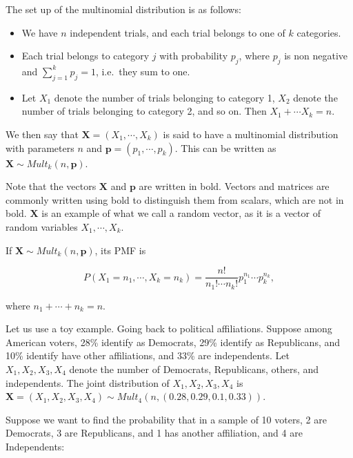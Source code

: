 \documentclass[
]{book}
\providecommand{\tightlist}{%
  \setlength{\itemsep}{0pt}\setlength{\parskip}{0pt}}
\begin{document}
The set up of the multinomial distribution is as follows:

\begin{itemize}
\tightlist
\item
  We have \(n\) independent trials, and each trial belongs to one of \(k\) categories.
\item
  Each trial belongs to category \(j\) with probability \(p_j\), where \(p_j\) is non negative and \(\sum_{j=1}^k p_j = 1\), i.e.~they sum to one.
\item
  Let \(X_1\) denote the number of trials belonging to category 1, \(X_2\) denote the number of trials belonging to category 2, and so on. Then \(X_1 + \cdots X_k = n\).
\end{itemize}

We then say that \(\boldsymbol{X} = (X_1, \cdots, X_k)\) is said to have a multinomial distribution with parameters \(n\) and \(\boldsymbol{p} = (p_1, \cdots, p_k)\). This can be written as \(\boldsymbol{X} \sim Mult_k(n, \boldsymbol{p})\).

Note that the vectors \(\boldsymbol{X}\) and \(\boldsymbol{p}\) are written in bold. Vectors and matrices are commonly written using bold to distinguish them from scalars, which are not in bold. \(\boldsymbol{X}\) is an example of what we call a random vector, as it is a vector of random variables \(X_1, \cdots, X_k\).

If \(\boldsymbol{X} \sim Mult_k(n, \boldsymbol{p})\), its PMF is

\begin{equation} 
P(X_1 = n_1, \cdots, X_k = n_k) = \frac{n!}{n_{1}! \cdots n_{k}!} p_1^{n_1} \cdots p_k^{n_k},
\label{eq:5-multinomial}
\end{equation}

where \(n_1 + \cdots + n_k = n\).

Let us use a toy example. Going back to political affiliations. Suppose among American voters, 28\% identify as Democrats, 29\% identify as Republicans, and 10\% identify have other affiliations, and 33\% are independents. Let \(X_1, X_2, X_3, X_4\) denote the number of Democrats, Republicans, others, and independents. The joint distribution of \(X_1, X_2, X_3, X_4\) is \(\boldsymbol{X} = (X_1, X_2, X_3, X_4) \sim Mult_4(n, (0.28, 0.29, 0.1, 0.33))\).

Suppose we want to find the probability that in a sample of 10 voters, 2 are Democrats, 3 are Republicans, and 1 has another affiliation, and 4 are Independents:
\end{document}
